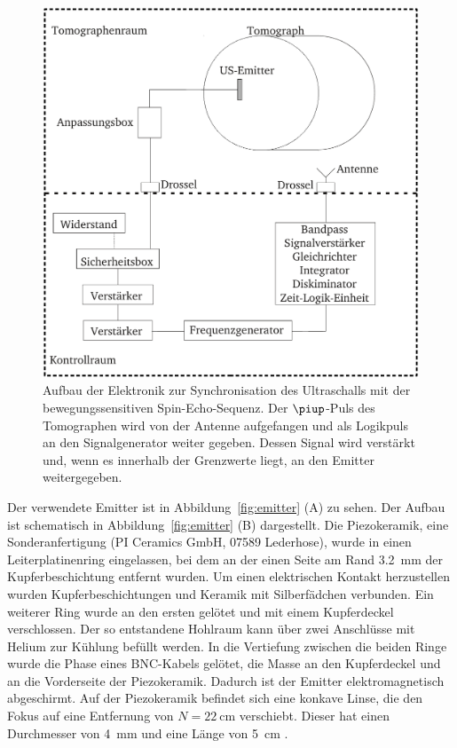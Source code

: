\documentclass[
    11pt,
    ngerman
]{scrbook}
\begin{document}
\begin{figure}[htbp]
    \centering
    \includegraphics[width=.8\textwidth]{Abbildungen/elektronik.pdf}
    \caption{%
        Aufbau der Elektronik zur Synchronisation des Ultraschalls mit der bewegungssensitiven Spin-Echo-Sequenz. Der $\piup$-Puls des Tomographen wird von der Antenne aufgefangen und als Logikpuls an den Signalgenerator weiter gegeben. Dessen Signal wird verstärkt und, wenn es innerhalb der Grenzwerte liegt, an den Emitter weitergegeben.
    }
    \label{fig:elektronik}
\end{figure}

Der verwendete Emitter ist in Abbildung~\ref{fig:emitter} (A) zu sehen. Der
Aufbau ist schematisch in Abbildung~\ref{fig:emitter} (B) dargestellt. Die
Piezokeramik, eine Sonderanfertigung (PI Ceramics GmbH, 07589 Lederhose),
wurde in einen Leiterplatinenring eingelassen, bei dem an der einen Seite am
Rand \SI{3.2}{\milli\meter} der Kupferbeschichtung entfernt wurden. Um einen
elektrischen Kontakt herzustellen wurden Kupferbeschichtungen und Keramik mit
Silberfädchen verbunden. Ein weiterer Ring wurde an den ersten gelötet und mit
einem Kupferdeckel verschlossen. Der so entstandene Hohlraum kann über zwei
Anschlüsse mit Helium zur Kühlung befüllt werden. In die Vertiefung zwischen
die beiden Ringe wurde die Phase eines BNC-Kabels gelötet, die Masse an den
Kupferdeckel und an die Vorderseite der Piezokeramik. Dadurch ist der Emitter
elektromagnetisch abgeschirmt. Auf der Piezokeramik befindet sich eine konkave
Linse, die den Fokus auf eine Entfernung von $N = \SI{22}{\centi\meter}$
verschiebt. Dieser hat einen Durchmesser von \SI{4}{\milli\meter} und eine
Länge von \SI{5}{\centi\meter} \parencite{diss_radicke}.
\end{document}
